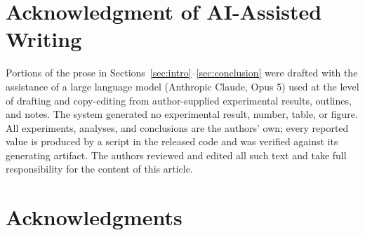 \section*{Acknowledgment of AI-Assisted Writing}

Portions of the prose in Sections~\ref{sec:intro}--\ref{sec:conclusion} were
drafted with the assistance of a large language model (Anthropic Claude, Opus 5)
used at the level of drafting and copy-editing from author-supplied experimental
results, outlines, and notes. The system generated no experimental result,
number, table, or figure. All experiments, analyses, and conclusions are the
authors' own; every reported value is produced by a script in the released code
and was verified against its generating artifact. The authors reviewed and
edited all such text and take full responsibility for the content of this
article.

\ifblind\else
\section*{Acknowledgments}
\fi
